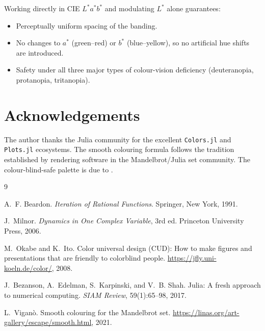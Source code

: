 \documentclass[11pt,a4paper]{article}
\theoremstyle{definition}
\newcommand{\pkg}[1]{\texttt{#1}}
\begin{document}
Working directly in CIE $L^*a^*b^*$ and modulating $L^*$ alone guarantees:
\begin{itemize}[nosep]
  \item Perceptually uniform spacing of the banding.
  \item No changes to $a^*$ (green–red) or $b^*$ (blue–yellow), so no
    artificial hue shifts are introduced.
  \item Safety under all three major types of colour-vision deficiency
    (deuteranopia, protanopia, tritanopia).
\end{itemize}

\section{Acknowledgements}

The author thanks the Julia community for the excellent \pkg{Colors.jl} and
\pkg{Plots.jl} ecosystems.
The smooth colouring formula follows the tradition established by rendering
software in the Mandelbrot/Julia set community.
The colour-blind-safe palette is due to \citet{okabe2008}.


\begin{thebibliography}{9}

A.~F. Beardon.
\newblock \emph{Iteration of Rational Functions}.
\newblock Springer, New York, 1991.

J.~Milnor.
\newblock \emph{Dynamics in One Complex Variable}, 3rd ed.
\newblock Princeton University Press, 2006.

M.~Okabe and K.~Ito.
\newblock Color universal design (CUD): How to make figures and presentations
  that are friendly to colorblind people.
\newblock \url{https://jfly.uni-koeln.de/color/}, 2008.

J.~Bezanson, A.~Edelman, S.~Karpinski, and V.~B. Shah.
\newblock Julia: A fresh approach to numerical computing.
\newblock \emph{SIAM Review}, 59(1):65--98, 2017.

L.~Vigan\`o.
\newblock Smooth colouring for the Mandelbrot set.
\newblock \url{https://linas.org/art-gallery/escape/smooth.html}, 2021.

\end{thebibliography}
\end{document}
